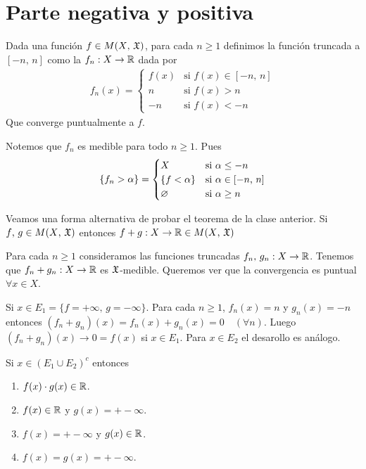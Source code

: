 \section{Parte negativa y positiva}

\begin{definition}
    Dada una función $f \in M(X\text{, } \mathfrak{X})$, para cada $n \geq 1$ definimos la función truncada a $[-n\text{, } n]$ como la $f_n : X \to \mathbb{R}$ dada por
    \begin{align*}
        f_n(x) = \begin{cases}
                     f(x) & \text{si } f(x) \in [-n \text{, } n] \\
                     n    & \text{si } f(x) > n                  \\
                     -n   & \text{si } f(x) < -n
                 \end{cases}
    \end{align*}
    Que converge puntualmente a $f$.
\end{definition}

Notemos que $f_n$ es medible para todo $n \geq 1$. Pues \begin{align*}
    \{ f_n > \alpha \} = \begin{cases}
                             X                & \text{si } \alpha \leq -n              \\
                             \{ f < \alpha \} & \text{si } \alpha \in [-n \text{, } n] \\
                             \varnothing               & \text{si } \alpha \geq n
                         \end{cases}
\end{align*}

Veamos una forma alternativa de probar el teorema de la clase anterior.
Si $f\text{, } g \in M(X\text{, } \mathfrak{X})$ entonces $f + g: X \to \mathbb{R} \in M(X\text{, } \mathfrak{X})$

Para cada $n \geq 1$ consideramos las funciones truncadas $f_n\text{, } g_n : X \to \mathbb{R}$.
Tenemos que $f_n + g_n : X \to \mathbb{R}$ es $\mathfrak{X}$-medible. Queremos ver que la convergencia es puntual $\forall x \in X$.

Si $x \in E_1 = \{ f = +\infty \text{, } g = -\infty \}$. Para cada $n \geq 1$,
$f_n(x) = n$ y $g_n(x) = -n$ entonces $(f_n + g_n)(x) = f_n(x) + g_n(x) = 0 \quad (\forall n)$.
Luego $(f_n + g_n)(x) \to 0 = f(x)$ si $x \in E_1$. Para $x \in E_2$ el desarollo es análogo.

Si $x \in (E_1 \cup E_2)^c$ entonces \begin{enumerate}
    \item $f(x) \cdot g(x) \in \mathbb{R}$.
    \item $f(x) \in \mathbb{R}$ y $g(x) = +-\infty$.
    \item $f(x) = +-\infty$ y $g(x) \in \mathbb{R}$.
    \item $f(x) = g(x) = +-\infty$.
\end{enumerate}

